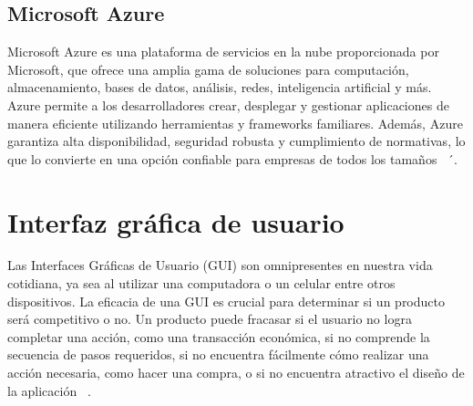 \subsection{Microsoft Azure}
Microsoft Azure es una plataforma de servicios en la nube proporcionada por Microsoft, que ofrece una amplia gama de soluciones para computación, almacenamiento, bases de datos, análisis, redes, inteligencia artificial y más. Azure permite a los desarrolladores crear, desplegar y gestionar aplicaciones de manera eficiente utilizando herramientas y frameworks familiares. Además, Azure garantiza alta disponibilidad, seguridad robusta y cumplimiento de normativas, lo que lo convierte en una opción confiable para empresas de todos los tamaños ~\cite{microsoft_azure}´. 

\section{Interfaz gráfica de usuario}
Las Interfaces Gráficas de Usuario (GUI) son omnipresentes en nuestra vida cotidiana, ya sea al utilizar una computadora o un celular entre otros dispositivos. La eficacia de una GUI es crucial para determinar si un producto será competitivo o no. Un producto puede fracasar si el usuario no logra completar una acción, como una transacción económica, si no comprende la secuencia de pasos requeridos, si no encuentra fácilmente cómo realizar una acción necesaria, como hacer una compra, o si no encuentra atractivo el diseño de la aplicación ~\cite{interfazAlbornoz}.
